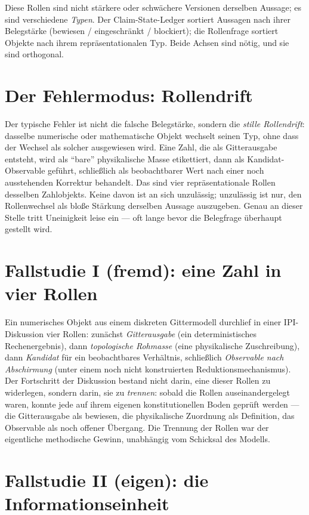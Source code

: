 Diese Rollen sind nicht stärkere oder schwächere Versionen derselben Aussage; es sind
verschiedene \emph{Typen}. Der Claim-State-Ledger sortiert Aussagen nach ihrer
Belegstärke (bewiesen / eingeschränkt / blockiert); die Rollenfrage sortiert Objekte
nach ihrem repräsentationalen Typ. Beide Achsen sind nötig, und sie sind orthogonal.

\section{Der Fehlermodus: Rollendrift}

Der typische Fehler ist nicht die falsche Belegstärke, sondern die \emph{stille
Rollendrift}: dasselbe numerische oder mathematische Objekt wechselt seinen Typ, ohne
dass der Wechsel als solcher ausgewiesen wird. Eine Zahl, die als Gitterausgabe entsteht,
wird als \enquote{bare} physikalische Masse etikettiert, dann als Kandidat-Observable
geführt, schließlich als beobachtbarer Wert nach einer noch ausstehenden Korrektur
behandelt. Das sind vier repräsentationale Rollen desselben Zahlobjekts. Keine davon ist
an sich unzulässig; unzulässig ist nur, den Rollenwechsel als bloße Stärkung derselben
Aussage auszugeben. Genau an dieser Stelle tritt Uneinigkeit leise ein --- oft lange
bevor die Belegfrage überhaupt gestellt wird.

\section{Fallstudie I (fremd): eine Zahl in vier Rollen}

Ein numerisches Objekt aus einem diskreten Gittermodell durchlief in einer
IPI-Diskussion vier Rollen: zunächst \emph{Gitterausgabe} (ein deterministisches
Rechenergebnis), dann \emph{topologische Rohmasse} (eine physikalische Zuschreibung),
dann \emph{Kandidat} für ein beobachtbares Verhältnis, schließlich \emph{Observable nach
Abschirmung} (unter einem noch nicht konstruierten Reduktionsmechanismus). Der
Fortschritt der Diskussion bestand nicht darin, eine dieser Rollen zu widerlegen,
sondern darin, sie zu \emph{trennen}: sobald die Rollen auseinandergelegt waren, konnte
jede auf ihrem eigenen konstitutionellen Boden geprüft werden --- die Gitterausgabe als
bewiesen, die physikalische Zuordnung als Definition, das Observable als noch offener
Übergang. Die Trennung der Rollen war der eigentliche methodische Gewinn, unabhängig vom
Schicksal des Modells.

\section{Fallstudie II (eigen): die Informationseinheit}

